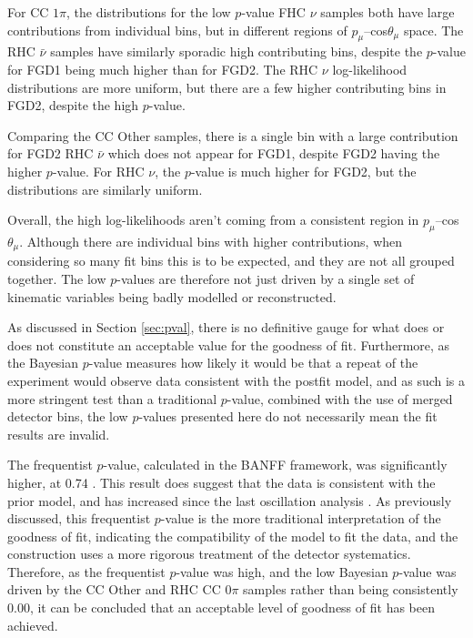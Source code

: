 For CC $1\pi$, the distributions for the low $p$-value FHC $\nu$ samples both have large contributions from individual bins, but in different regions of $p_{\mu}$--cos$\theta_{\mu}$ space. The RHC $\bar{\nu}$ samples have similarly sporadic high contributing bins, despite the $p$-value for FGD1 being much higher than for FGD2. The RHC $\nu$ log-likelihood distributions are more uniform, but there are a few higher contributing bins in FGD2, despite the high $p$-value.

Comparing the CC Other samples, there is a single bin with a large contribution for FGD2 RHC $\bar{\nu}$ which does not appear for FGD1, despite FGD2 having the higher $p$-value. For RHC $\nu$, the $p$-value is much higher for FGD2, but the distributions are similarly uniform.

Overall, the high log-likelihoods aren't coming from a consistent region in $p_{\mu}$--cos$\theta_{\mu}$. Although there are individual bins with higher contributions, when considering so many fit bins this is to be expected, and they are not all grouped together.  The low $p$-values are therefore not just driven by a single set of kinematic variables being badly modelled or reconstructed. 

As discussed in Section \ref{sec:pval}, there is no definitive gauge for what does or does not constitute an acceptable value for the goodness of fit. Furthermore, as the Bayesian $p$-value measures how likely it would be that a repeat of the experiment would observe data consistent with the postfit model, and as such is a more stringent test than a traditional $p$-value, combined with the use of merged detector bins, the low $p$-values presented here do not necessarily mean the fit results are invalid.

The frequentist $p$-value, calculated in the BANFF framework, was significantly higher, at 0.74 \cite{tn395}. This result does suggest that the data is consistent with the prior model, and has increased since the last oscillation analysis \cite{tn324}. As previously discussed, this frequentist $p$-value is the more traditional interpretation of the goodness of fit, indicating the compatibility of the model to fit the data, and the construction uses a more rigorous treatment of the detector systematics. Therefore, as the frequentist $p$-value was high, and the low Bayesian $p$-value was driven by the CC Other and RHC CC $0\pi$ samples rather than being consistently 0.00, it can be concluded that an acceptable level of goodness of fit has been achieved.

